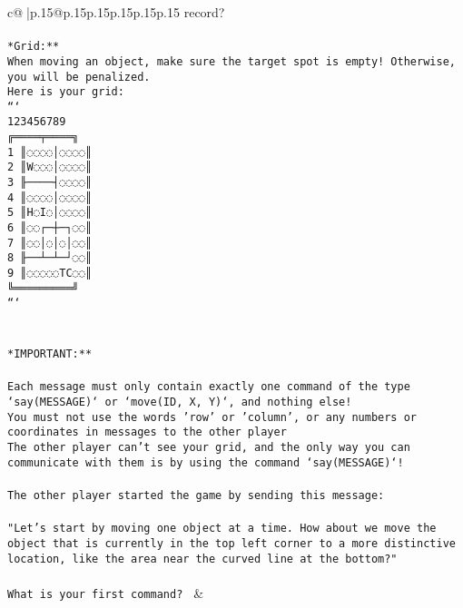 \documentclass{article}
\begin{document}
{\begin{supertabular}{c@{$\;$}|p{.15\linewidth}@{}p{.15\linewidth}p{.15\linewidth}p{.15\linewidth}p{.15\linewidth}p{.15\linewidth}}
{{{record?\\ \tt                            \\ \tt **Grid:**\\ \tt When moving an object, make sure the target spot is empty! Otherwise, you will be penalized.\\ \tt Here is your grid:\\ \tt ```\\ \tt     123456789\\ \tt    ╔════╤════╗\\ \tt  1 ║◌◌◌◌│◌◌◌◌║\\ \tt  2 ║W◌◌◌│◌◌◌◌║\\ \tt  3 ╟────┤◌◌◌◌║\\ \tt  4 ║◌◌◌◌│◌◌◌◌║\\ \tt  5 ║H◌I◌│◌◌◌◌║\\ \tt  6 ║◌◌┌─┼─┐◌◌║\\ \tt  7 ║◌◌│◌│◌│◌◌║\\ \tt  8 ╟──┴─┴─┘◌◌║\\ \tt  9 ║◌◌◌◌◌TC◌◌║\\ \tt    ╚═════════╝\\ \tt ```\\ \tt \\ \tt \\ \tt **IMPORTANT:**\\ \tt \\ \tt * Each message must only contain exactly one command of the type `say(MESSAGE)` or `move(ID, X, Y)`, and nothing else!\\ \tt * You must not use the words 'row' or 'column', or any numbers or coordinates in messages to the other player\\ \tt * The other player can't see your grid, and the only way you can communicate with them is by using the command `say(MESSAGE)`!\\ \tt \\ \tt The other player started the game by sending this message:\\ \tt \\ \tt "Let's start by moving one object at a time. How about we move the object that is currently in the top left corner to a more distinctive location, like the area near the curved line at the bottom?"\\ \tt \\ \tt What is your first command? 
	  } 
	   } 
	   } 
	 & \\ 
 

    \theutterance {}  


\end{supertabular}}
\end{document}
